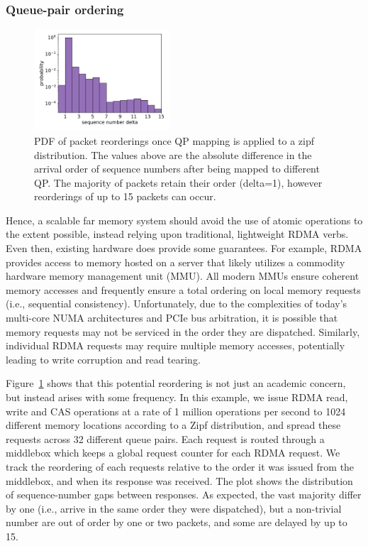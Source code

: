 \subsubsection{Queue-pair ordering}

\begin{figure}[t]
    \includegraphics[width=0.45\textwidth]{fig/qp_reordering.pdf}
    
    \caption{PDF of packet reorderings once QP mapping is applied to a zipf
    distribution. The values above are the absolute difference in the arrival
    order of sequence numbers after being mapped to different QP. The majority
    of packets retain their order (delta=1), however reorderings of up to 15
    packets can occur.}

    \label{fig:reorder}
\end{figure}

Hence, a scalable far memory system should avoid the use of atomic
operations to the extent possible, instead relying upon traditional,
lightweight RDMA verbs.  Even then, existing hardware does provide
some guarantees.  For example, RDMA provides access to memory hosted
on a server that likely utilizes a commodity hardware memory
management unit (MMU).  All modern MMUs ensure coherent memory
accesses and frequently ensure a total ordering on local memory
requests (i.e., sequential consistency).  Unfortunately, due to the
complexities of today's multi-core NUMA architectures and PCIe bus
arbitration, it is possible that memory requests may not be serviced
in the order they are dispatched.  Similarly, individual RDMA requests
may require multiple memory accesses, potentially leading to
write corruption and read tearing.

Figure~\ref{fig:reorder} shows that this potential reordering is not just an
academic concern, but instead arises with some frequency. In this example, we
issue RDMA read, write and CAS operations at a rate of 1 million operations per
second to 1024 different memory locations according to a Zipf distribution, and
spread these requests across 32 different queue pairs. Each request is routed
through a middlebox which keeps a global request counter for each RDMA request.
We track the reordering of each requests relative to the order it was issued
from the middlebox, and when its response was received.  The plot shows the
distribution of sequence-number gaps between responses.  As expected, the vast
majority differ by one (i.e., arrive in the same order they were dispatched),
but a non-trivial number are out of order by one or two packets, and some are
delayed by up to 15.

